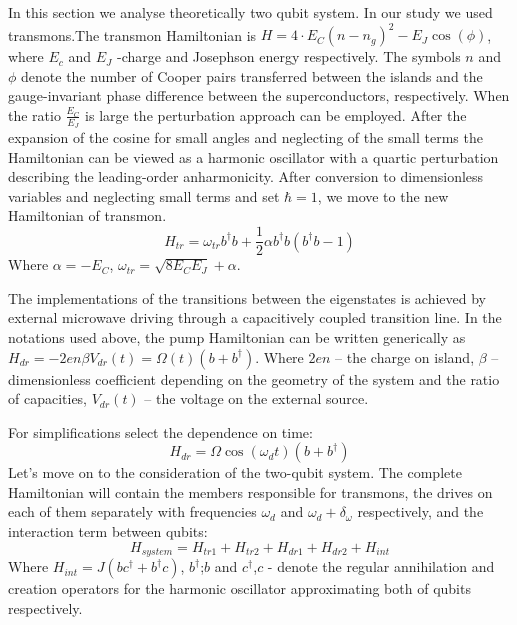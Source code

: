 \documentclass[%
 aip,
 amsmath,amssymb,
 reprint,%
]{revtex4-1}
\begin{document}
In this section we analyse theoretically two qubit system.
 In our study we used transmons.The transmon Hamiltonian is $H = 4\cdot E_C(n-n_g)^2 -E_J\cos(\phi)$, where $E_c $ and $E_J$ -charge and Josephson energy respectively. The symbols $n$ and $\phi$ denote the number of Cooper pairs transferred between the islands and the
 gauge-invariant phase difference between the superconductors,
 respectively.
 When the ratio $\frac{E_C}{E_J}$ is large the perturbation approach can
 be employed. After the expansion of the cosine for small angles and neglecting of the small terms the Hamiltonian can be
 viewed as a harmonic oscillator with a quartic perturbation describing the leading-order anharmonicity.
 After conversion to dimensionless variables and neglecting small terms and set $\hbar = 1$, we move to the new Hamiltonian of transmon. 
\begin{equation}
H_{tr}= \omega_{tr} b^{\dagger}b +\frac{1}{2}\alpha b^{\dagger}b(b^{\dagger}b-1)
\end{equation}
Where $\alpha=-E_C$, $\omega_{tr}=\sqrt{8E_CE_J}+\alpha$.


The implementations of the transitions between the eigenstates is achieved by external microwave driving through a capacitively coupled transition line. In the notations used above, the pump Hamiltonian can be written generically as $ 	H_{dr} = -2e n\beta V_{dr}(t)=\Omega(t)(b+b^{\dagger})$.
Where $2en$ -- the charge on island, $\beta$ -- dimensionless coefficient depending on the geometry of the system and the ratio of capacities, $V_{dr}(t)$ -- the voltage on the external source.

For simplifications select the dependence on time:
\begin{equation}
H_{dr} = \Omega\cos(\omega_d t)(b+b^{\dagger})
\end{equation}
Let's move on to the consideration of the two-qubit system. The complete Hamiltonian will contain the members responsible for transmons, the drives on each of them separately with frequencies $\omega_d$ and $\omega_d+\delta_{\omega}$ respectively, and the interaction term between qubits:
\begin{equation}\label{Hsystem}
H_{system}= H_{tr1}+H_{tr2}+H_{dr1}+H_{dr2}+H_{int}
\end{equation}
Where $H_{int}= J(bc^{\dagger}+b^{\dagger}c)$, $b^{\dagger}$;$b$ and $c^{\dagger}$,$c$ - denote the regular annihilation and creation operators
for the harmonic oscillator approximating both of qubits respectively.
\end{document}
